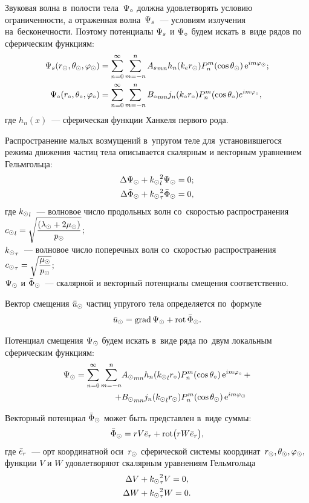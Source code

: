Звуковая волна в~полости тела~$\P\c$ должна удовлетворять условию ограниченности, а отраженная волна~$\P\sc$~--- условиям излучения на~бесконечности. Поэтому потенциалы $\P\sc$ и $\P\c$ будем искать в~виде рядов по сферическим функциям:
\begin{align}\P\sc(r\s, \Q\s, \f\s) &= \sum\limits_{n = 0}^\infty \sum\limits_{m = -n}^n {A\sc}_{mn} h_n(k\en r\s) P_n^m(\cos\Q\s)\e^{im\f\s};\label{eq_psc}\\
\P\c(r\c, \Q\c, \f\c) &= \sum\limits_{n = 0}^\infty \sum\limits_{m = -n}^n {B\c}_{mn} j_n(k\c r\c) P_n^m(\cos\Q\c)e^{im\f\c},\label{eq_pc}
\end{align}
где $h_n(x)$~--- сферическая функции Ханкеля первого рода.

Распространение малых возмущений в~упругом теле для~установившегося режима движения частиц тела описывается скалярным и векторным уравнением Гельмгольца:
\begin{align}
\Lap\P\s &+ {k\s}_l^2\P\s = 0;\label{Helmholtz_scalar}\\
\Lap\F\s &+ {k\s}_\t^2\F\s = 0,\label{Helmholtz_vector}
\end{align}
где ${k\s}_l$~--- волновое число продольных волн со~скоростью распространения \break 
${c\s}_l = \sqrt{\df{(\la\s + 2\mu\s)}{p\s}}$;\\
${k\s}_\t$~--- волновое число поперечных волн со~скоростью распространения \\
${c\s}_\t = \sqrt{\df{\mu\s}{p\s}}$;\\
$\P\s$ и $\F\s$~--- скалярной и векторный потенциалы смещения соответственно.

Вектор смещения $\u\s$ частиц упругого тела определяется по~формуле
$$
\u\s = \grad \P\s + \rot \F\s.
$$

Потенциал смещения $\P\s$ будем искать в~виде ряда по~двум локальным сферическим функциям:
\begin{equation}\label{eq_ps}
\begin{split}
\P\s = \sum\limits_{n=0}^\infty \sum\limits_{m=-n}^n
  &{A\s}_{mn} h_n({k\s}_lr\c)P_n^m(\cos\Q\c)\e^{im\f\c} +\\
+ &{B\s}_{mn} j_n({k\s}_lr\s)P_n^m(\cos\Q\s)\e^{im\f\s}
\end{split}
\end{equation}

Векторный потенциал $\F\s$ может быть представлен в~виде суммы:
$$
\F\s = rV\er + \rot\bigl(rW\er\bigr),
$$
где $\er$~--- орт координатной оси~$r\s$ сферической системы координат~$r\s, \Q\s, \f\s,$\\
функции $V$ и $W$ удовлетворяют скалярным уравнениям Гельмгольца
\begin{align}
\Lap V &+ {k\s}_\t^2 V = 0,\label{eq_V}\\
\Lap W &+ {k\s}_\t^2 W = 0.\label{eq_W}
\end{align}


